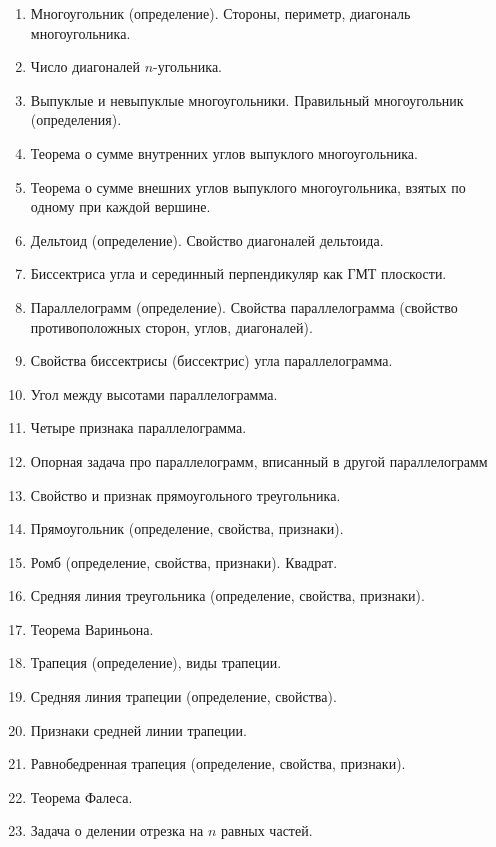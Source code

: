 \documentclass{article}
\begin{document}
    \begin{large}
        \begin{enumerate}[label=\arabic*)]
            \item Многоугольник (определение).
            Стороны, периметр, диагональ многоугольника.
            \item Число диагоналей $n$-угольника.
            \item Выпуклые и невыпуклые многоугольники.
            Правильный многоугольник (определения).
            \item Теорема о сумме внутренних углов выпуклого многоугольника.
            \item Теорема о сумме внешних углов выпуклого многоугольника,
            взятых по одному при каждой вершине.
            \item Дельтоид (определение).
            Свойство диагоналей дельтоида.
            \item Биссектриса угла и серединный перпендикуляр как ГМТ плоскости.
            \item Параллелограмм (определение).
            Свойства параллелограмма (свойство противоположных сторон, углов, диагоналей).
            \item Свойства биссектрисы (биссектрис) угла параллелограмма.
            \item Угол между высотами параллелограмма.
            \item Четыре признака параллелограмма.
            \item Опорная задача про параллелограмм, вписанный в другой параллелограмм
            \item Свойство и признак прямоугольного треугольника.
            \item Прямоугольник (определение, свойства, признаки).
            \item Ромб (определение, свойства, признаки). Квадрат.
            \item Средняя линия треугольника (определение, свойства, признаки).
            \item Теорема Вариньона.
            \item Трапеция (определение), виды трапеции.
            \item Средняя линия трапеции (определение, свойства).
            \item Признаки средней линии трапеции.
            \item Равнобедренная трапеция (определение, свойства, признаки).
            \item Теорема Фалеса.
            \item Задача о делении отрезка на $n$ равных частей.
        \end{enumerate}
    \end{large}
\end{document}
